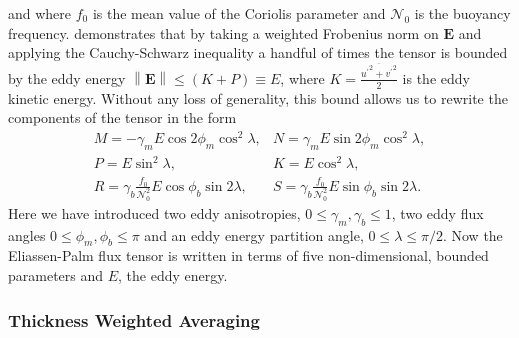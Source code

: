 \documentclass[10pt,a4paper]{report}
\newcommand*\mean[1]{\overline{#1}}
\newcommand*\res[1]{{#1}^{\prime}}
\begin{document}
                 and where $f_{0}$ is the mean value of the Coriolis parameter and $\mathcal{N}_{0}$ is the buoyancy frequency. \cite{marshall2012framework}
                demonstrates that by taking a weighted Frobenius norm on $\boldsymbol{E} $
                and applying the Cauchy-Schwarz inequality a handful of times the 
                 tensor is bounded by the eddy energy ${\left\|\boldsymbol{E}\right\|\leq\left(K+P\right)\equiv E}$,
                 where $K=\frac{\mean{{\res{u}}^{2} + {\res{v}}^{2}}}{2}$ is the eddy
                 kinetic energy.
                 Without any loss of generality, this bound allows us to rewrite the components of the tensor in the form
                 \begin{equation}
                 \begin{array}{cc}
                 M = -\gamma_{m}E\cos{2\phi_{m}}\cos^{2}{\lambda}, & 
                 N = \gamma_{m}E\sin{2\phi_{m}}\cos^{2}{\lambda}, \\
                 P =  E\sin^{2}{\lambda}, &  K =  E\cos^{2}{\lambda},  \\
                 R =  \gamma_{b}\frac{f_{0}}{\mathcal{N}_{0}^{2}}E\cos{\phi_{b}}\sin{2\lambda}, &
                 S = \gamma_{b}\frac{f_{0}}{\mathcal{N}_{0}^{2}}E\sin{\phi_{b}}\sin{2\lambda} .
                 \end{array} 
                 \end{equation}
                 Here we have introduced two eddy anisotropies, $0\leq\gamma_{m},\gamma_{b}\leq1$, two eddy flux angles $0\leq\phi_{m},\phi_{b}\leq\pi$ and an eddy energy partition angle,
                 $0\leq\lambda\leq\pi/2$. Now the Eliassen-Palm flux tensor
                 is written in terms of five non-dimensional, bounded parameters
                 and $E$, the eddy energy.
                 
                 
                 
                 \subsubsection{Thickness Weighted Averaging}
                 
\end{document}
